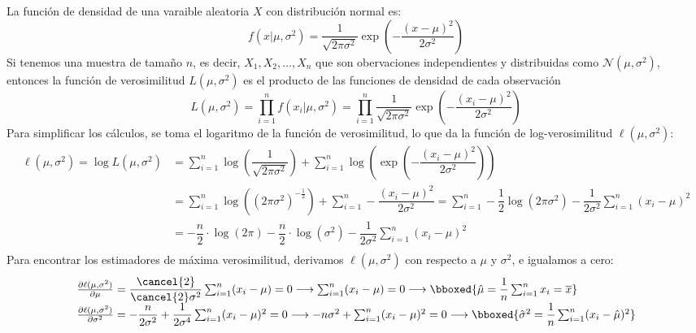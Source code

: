 \begin{itemize}[label=\color{red}\textbullet, leftmargin=*]
         La función de densidad de una varaible aleatoria $X$ con distribución normal es: \[
             f(x|\mu, \sigma^2)=\dfrac{1}{\sqrt{2\pi\sigma^2}}\exp \left( -\dfrac{(x-\mu)^2}{2\sigma^2} \right) 
         \] 
         Si tenemos una muestra de tamaño $n$, es decir, $X_1,X_2,\dots,X_n$ que son obervaciones independientes y distribuidas como $\mathcal{N}(\mu,\sigma^2)$, entonces la función de verosimilitud $L(\mu,\sigma^2)$ es el producto de las funciones de densidad de cada observación \[
         L(\mu,\sigma^2)=\prod_{i=1}^{n} f(x_i|\mu,\sigma^2)=\prod_{i=1}^{n} \dfrac{1}{\sqrt{2\pi\sigma^2} }  \exp\left( -\dfrac{(x_i-\mu)^2}{2\sigma^2} \right) 
         \] 
         Para simplificar los cálculos, se toma el logaritmo de la función de verosimilitud, lo que da la función de log-verosimilitud $\ell (\mu,\sigma^2)$: \[
         \begin{aligned}
             \ell(\mu,\sigma^2)=\log L(\mu,\sigma^2)&= \sum_{i=1}^{n} \log\left( \dfrac{1}{\sqrt{2\pi\sigma^2} } \right) +\sum_{i=1}^{n} \log\left( \exp\left( -\dfrac{(x_i-\mu)^2}{2\sigma^2} \right)  \right)  \\
             &= \sum_{i=1}^{n} \log\left( (2\pi\sigma^2)^{-\frac{1}{2} } \right) +\sum_{i=1}^{n} -\dfrac{(x_i-\mu)^2}{2\sigma^2}=\sum_{i=1}^{n} -\dfrac{1}{2}\log(2\pi\sigma^2)-\dfrac{1}{2\sigma^2}\sum_{i=1}^{n} (x_i-\mu)^2 \\
             &= -\dfrac{n}{2}\cdot \log(2\pi)-\dfrac{n}{2}\cdot \log(\sigma^2)-\dfrac{1}{2\sigma^2}\sum_{i=1}^{n} (x_i-\mu)^2 \\
         \end{aligned}
         \] 
         Para encontrar los estimadores de máxima verosimilitud, derivamos $\ell(\mu,\sigma^2)$ con respecto a $\mu$ y $\sigma^2$, e igualamos a cero:
         \[
         \begin{array}{l}
             \frac{\partial \ell(\mu,\sigma^2)}{\partial \mu} =\dfrac{\cancel{2} }{\cancel{2} \sigma^2}\sum_{i=1}^{n} (x_i-\mu)=0\longrightarrow \sum_{i=1}^{n} (x_i-\mu)=0\longrightarrow \bboxed{\hat{\mu}=\dfrac{1}{n}\sum_{i=1}^{n} x_i=\overline{x}}\\
             \frac{\partial \ell(\mu,\sigma^2)}{\partial \sigma^2} =-\dfrac{n}{2\sigma^2}+\dfrac{1}{2\sigma^4}\sum_{i=1}^{n} (x_i-\mu)^2=0\longrightarrow -n\sigma^2+\sum_{i=1}^{n} (x_i-\mu)^2=0\longrightarrow \bboxed{\hat{\sigma}^2=\dfrac{1}{n}\sum_{i=1}^{n} (x_i-\hat{\mu})^2} 
         \end{array}
         \] 
\end{itemize}
